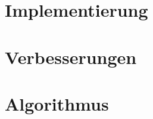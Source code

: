 \documentclass[a4paper]{scrreprt}
\theoremstyle{definition}
\begin{document}
\chapter{Implementierung}

\chapter{Verbesserungen}

\chapter{Algorithmus}










\end{document}
